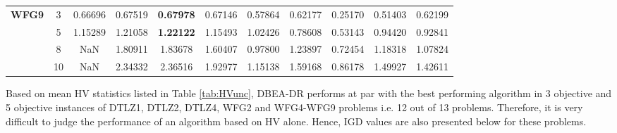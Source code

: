 \documentclass[conference]{IEEEtran}
\begin{document}
\begin{table*}[!htb]
\begin{tabular}{|c|c|c|c|c|c|c|c|c|c|c|}
		\multirow{4}{*}{\textbf{WFG9}}  & 3          & 0.66696          & 0.67519           & \textbf{0.67978}      & 0.67146          & 0.57864             & 0.62177             & 0.25170            & 0.51403              & 0.62199          \\ \cline{2-11} 
		& 5          & 1.15289          & 1.21058           & \textbf{1.22122}      & 1.15493          & 1.02426             & 0.78608             & 0.53143            & 0.94420              & 0.92841          \\ \cline{2-11} 
		& 8          & NaN              & 1.80911           & 1.83678               & 1.60407          & 0.97800             & 1.23897             & 0.72454            & 1.18318              & 1.07824          \\ \cline{2-11} 
		& 10         & NaN              & 2.34332           & 2.36516               & 1.92977          & 1.15138             & 1.59168             & 0.86178            & 1.49927              & 1.42611          \\ \hline
	\end{tabular}
\end{table*}

Based on mean HV statistics listed in Table \ref{tab:HVunc}, DBEA-DR performs at par with the best performing algorithm in 3 objective and 5 objective instances of DTLZ1, DTLZ2, DTLZ4, WFG2 and WFG4-WFG9 problems i.e. 12 out of 13 problems. 
Therefore, it is very difficult to judge the performance of an algorithm based on HV alone. Hence, IGD values are also presented below for these problems. 
\end{document}
